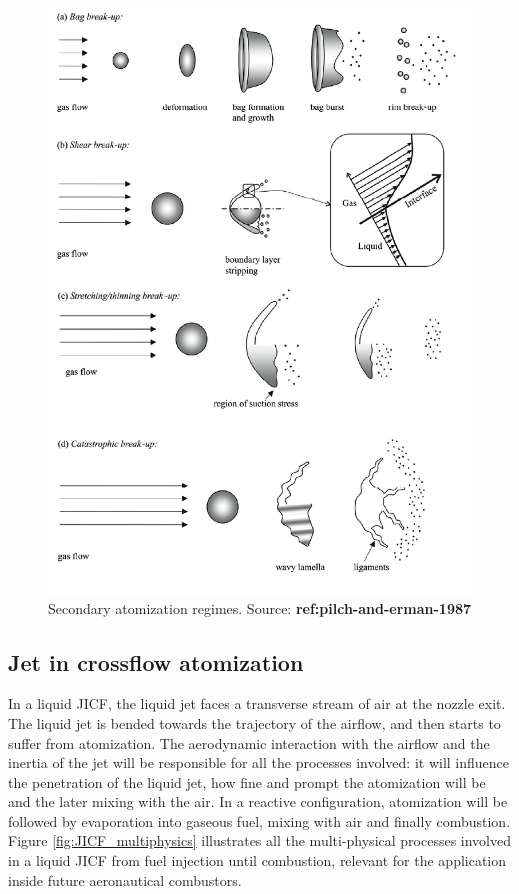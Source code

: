\begin{figure}[h!]
	\centering
	\includegraphics[scale=0.5]{./part0_intro/regimes_atomization_secondary}
	\caption{Secondary atomization regimes. Source: \textbf{ref:pilch-and-erman-1987}}
	\label{fig:regimes_atomization_secondary}
\end{figure}


\subsection*{Jet in crossflow atomization}

In a liquid JICF, the liquid jet faces a transverse stream of air at the nozzle exit. The liquid jet is bended towards the trajectory of the airflow, and then starts to suffer from atomization. The aerodynamic interaction with the airflow and the inertia of the jet will be responsible for all the processes involved: it will influence
the penetration of the liquid jet, how fine and prompt the atomization will be and the later mixing with the air. In a reactive configuration, atomization will be followed by evaporation into gaseous fuel, mixing with air and finally combustion. Figure \ref{fig:JICF_multiphysics} illustrates all the multi-physical processes involved in a liquid JICF from fuel injection until combustion, relevant for the application inside future aeronautical combustors.


